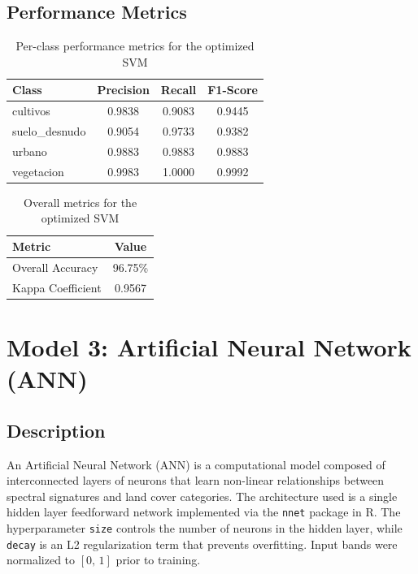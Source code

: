 \documentclass[12pt,a4paper]{article}
\begin{document}
\subsection{Performance Metrics}

\begin{table}[H]
\centering
\begin{tabular}{|m{4cm}|c|c|c|}
\hline
\textbf{Class} & \textbf{Precision} & \textbf{Recall} & \textbf{F1-Score} \\
\hline
cultivos       & 0.9838 & 0.9083 & 0.9445 \\
\hline
suelo\_desnudo & 0.9054 & 0.9733 & 0.9382 \\
\hline
urbano         & 0.9883 & 0.9883 & 0.9883 \\
\hline
vegetacion     & 0.9983 & 1.0000 & 0.9992 \\
\hline
\end{tabular}
\caption{Per-class performance metrics for the optimized SVM}
\end{table}

\begin{table}[H]
\centering
\begin{tabular}{|m{5cm}|c|}
\hline
\textbf{Metric} & \textbf{Value} \\
\hline
Overall Accuracy  & 96.75\% \\
\hline
Kappa Coefficient & 0.9567 \\
\hline
\end{tabular}
\caption{Overall metrics for the optimized SVM}
\end{table}

\section{Model 3: Artificial Neural Network (ANN)}

\subsection{Description}

An Artificial Neural Network (ANN) is a computational model composed of interconnected layers of neurons that learn non-linear relationships between spectral signatures and land cover categories. The architecture used is a single hidden layer feedforward network implemented via the \texttt{nnet} package in R. The hyperparameter \texttt{size} controls the number of neurons in the hidden layer, while \texttt{decay} is an L2 regularization term that prevents overfitting. Input bands were normalized to $[0,\,1]$ prior to training.
\end{document}
